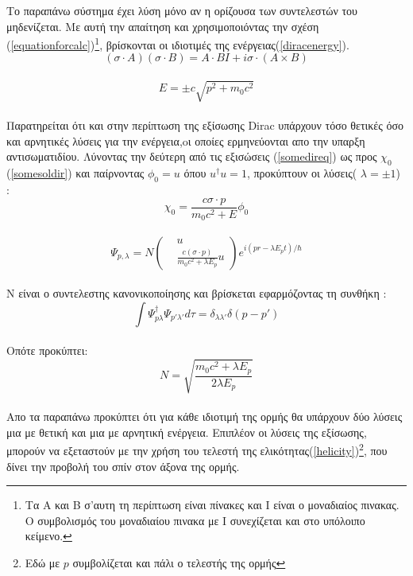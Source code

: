 Το παραπάνω σύστημα έχει λύση μόνο αν η ορίζουσα των συντελεστών του μηδενίζεται. Με αυτή την απαίτηση και χρησιμοποιόντας την σχέση (\ref{equationforcalc})\footnote{Τα Α και Β σ'αυτη τη περίπτωση είναι πίνακες και Ι είναι ο μοναδιαίος πινακας. Ο συμβολισμός του μοναδιαίου πινακα με Ι συνεχίζεται και στο υπόλοιπο κείμενο.}, βρίσκονται οι ιδιοτιμές της ενέργειας(\ref{diracenergy}). \\
\begin{equation} 
  (\sigma \cdot A) (\sigma \cdot B) = A \cdot B I +i\sigma \cdot (A \times B) 
  \label{equationforcalc}
\end{equation}
\\
\begin{equation} 
  E= \pm c\sqrt{p^2+m_0c^2}
  \label{diracenergy}
\end{equation}\\
Παρατηρείται ότι και στην περίπτωση της εξίσωσης \textlatin{Dirac} υπάρχουν τόσο θετικές όσο και αρνητικές λύσεις για την ενέργεια,oι οποίες ερμηνεύονται απο την υπαρξη αντισωματιδίου.
Λύνοντας την δεύτερη από τις  εξισώσεις (\ref{somedireq}) ως προς $\chi_0$ (\ref{somesoldir}) και παίρνοντας $\phi_0= u $ όπου $u^{\dagger}u=1$, προκύπτουν οι λύσεις( $\lambda=\pm 1$) : \\
\begin{equation}
  \chi_0 =\frac{c \sigma \cdot p }{m_0 c^2 + E}\phi_0
  \label{somesoldir}
\end{equation}\\
\begin{equation} 
  \Psi_{p,\lambda} =N 
    \begin{pmatrix}
    &u\\
    &\frac{c(\sigma \cdot p )}{m_0 c^2 + \lambda E_p}u
    \end{pmatrix}
    e^{i(pr-\lambda E_p t)/\hbar}
  \label{freesolutiondir}
\end{equation}\\
Ν είναι ο συντελεστης κανονικοποίησης και βρίσκεται εφαρμόζοντας τη συνθήκη :\\ 
\[ \int \Psi_{p \lambda}^{\dagger} \Psi_{p' \lambda'} d\tau=\delta_{\lambda \lambda'} \delta(p-p') \]\\
Οπότε προκύπτει:\\
\[N=\sqrt{\frac{m_0c^2+\lambda E_p}{2 \lambda E_p}} \]\\
Απο τα παραπάνω προκύπτει ότι για κάθε ιδιοτιμή της ορμής θα υπάρχουν δύο λύσεις μια με θετική και μια με αρνητική ενέργεια. Επιπλέον οι λύσεις της εξίσωσης, μπορούν να εξεταστούν με την χρήση του τελεστή της ελικότητας(\ref{helicity})\footnote{Εδώ με $p$ συμβολίζεται και πάλι ο τελεστής της ορμής}, που δίνει την προβολή του σπίν στον άξονα της ορμής. \\
